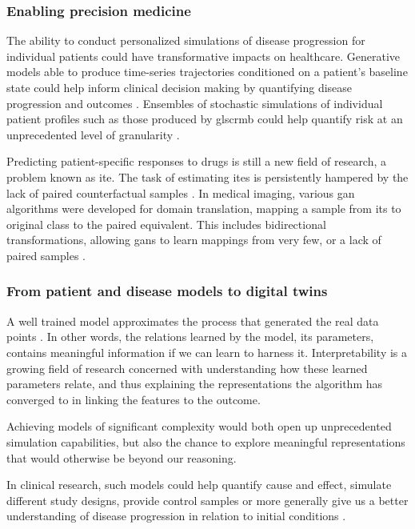     \subsubsection{Enabling precision medicine}\label{sec:precision_med}
    
    The ability to conduct personalized simulations of disease progression for individual patients could have transformative impacts on healthcare. Generative models able to produce time-series trajectories conditioned on a patient's baseline state could help inform clinical decision making by quantifying disease progression and outcomes \cite{walsh2020generating, Fisher2019}. Ensembles of stochastic simulations of individual patient profiles such as those produced by gls{crmb} could help quantify risk at an unprecedented level of granularity \cite{Fisher2019}.\par
    Predicting patient-specific responses to drugs is still a new field of research, a problem known as \gls{ite}. The task of estimating \glspl{ite} is persistently hampered by the lack of paired counterfactual samples \cite{Yoon2018-ite, chu2019treatment}. In medical imaging, various \gls{gan} algorithms were developed for domain translation, mapping a sample from its to original class to the paired equivalent. This includes bidirectional transformations, allowing \glspl{gan} to learn mappings from very few, or a lack of paired samples \cite{Wolterink2017DeepMT}.
    
    \subsubsection{From patient and disease models to digital twins}\label{sec:models_twins}
    
    A well trained model approximates the process that generated the real data points \cite{esteban2017real}. In other words, the relations learned by the model, its parameters, contains meaningful information if we can learn to harness it. Interpretability is a growing field of research concerned with understanding how these learned parameters relate, and thus explaining the representations the algorithm has converged to in linking the features to the outcome.\par
    Achieving models of significant complexity would both open up unprecedented simulation capabilities, but also the chance to explore meaningful representations that would otherwise be beyond our reasoning.\par 
    In clinical research, such models could help quantify cause and effect, simulate different study designs, provide control samples or more generally give us a better understanding of disease progression in relation to initial conditions \cite{Fisher2019, yahi2017generative, walsh2020generating}.\par
    
